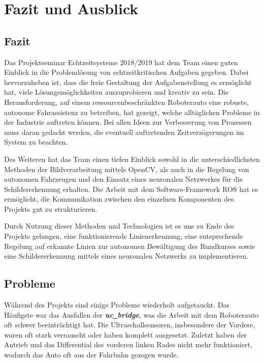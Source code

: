 \section{Fazit und Ausblick}
\label{sec:fazit}

\subsection{Fazit}
Das Projektseminar Echtzeitsysteme 2018/2019 hat dem Team einen guten Einblick in die Probleml\"osung von echtzeitkritischen Aufgaben gegeben. 
Dabei hervorzuheben ist, dass die freie Gestaltung der Aufgabenstellung es erm\"oglicht hat, viele L\"osungsm\"oglichkeiten auszuprobieren und kreativ zu sein. 
Die Herausforderung, auf einem ressourcenbeschr\"ankten Roboterauto eine robuste, autonome Fahrassistenz zu betreiben, hat gezeigt, welche allt\"aglichen Probleme in der Industrie auftreten k\"onnen. 
Bei allen Ideen zur Verbesserung von Prozessen muss daran gedacht werden, die eventuell auftretenden Zeitverz\"ogerungen im System zu beachten.

Des Weiteren hat das Team einen tiefen Einblick sowohl in die unterschiedlichsten Methoden der Bildverarbeitung mittels OpenCV, als auch in die Regelung von autonomen Fahrzeugen und den Einsatz eines neuronalen Netzwerkes f\"ur die Schildererkennung erhalten. 
Die Arbeit mit dem Software-Framework ROS\cite{ROS} hat es erm\"oglicht, die Kommunikation zwischen den einzelnen Komponenten des Projekts gut zu strukturieren.

Durch Nutzung dieser Methoden und Technologien ist es uns zu Ende des Projekts gelungen,
eine funktionierende Linienerkennung, eine entsprechende Regelung
auf erkannte Linien zur autonomen Bew\"altigung des Rundkurses sowie eine Schildererkennung
mittels eines neuronalen Netzwerks zu implementieren.

\subsection{Probleme}
W\"ahrend des Projekts sind einige Probleme wiederholt aufgetaucht. 
Das H\"aufigste war das Ausfallen der \textbf{\textit{uc\underline{\ }bridge}}, was die Arbeit mit dem Roboterauto oft schwer beeintr\"achtigt hat. 
Die Ultraschallsensoren, insbesondere der Vordere, waren oft stark verrauscht oder haben komplett ausgesetzt. 
Zuletzt haben der Antrieb und das Differential des vorderen linken Rades nicht mehr funktioniert, wodurch das Auto oft aus der Fahrbahn gezogen wurde.

